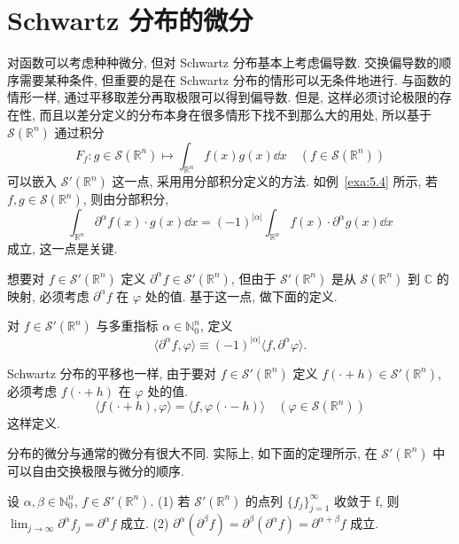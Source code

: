 
\section{Schwartz 分布的微分}\label{sec:5.5}




对函数可以考虑种种微分, 但对 Schwartz 分布基本上考虑偏导数. 交换偏导数的顺序需要某种条件, 但重要的是在 Schwartz 分布的情形可以无条件地进行. 与函数的情形一样, 通过平移取差分再取极限可以得到偏导数. 但是, 这样必须讨论极限的存在性, 而且以差分定义的分布本身在很多情形下找不到那么大的用处, 所以基于 $\mathcal{S}(\mathbb{R}^{n})$ 通过积分
\[
F_{f}: g \in \mathcal{S}(\mathbb{R}^{n}) \mapsto \int_{\mathbb{R}^{n}}f(x)g(x)\dd x \quad (f \in \mathcal{S}(\mathbb{R}^{n}))
\]
可以嵌入 $\mathcal{S}'(\mathbb{R}^{n})$ 这一点, 采用用分部积分定义的方法. 如例~\ref{exa:5.4} 所示, 若 $f, g \in \mathcal{S}(\mathbb{R}^{n})$, 则由分部积分,
\[
\int_{\mathbb{R}^{n}}\partial^{\alpha}f(x) \cdot g(x)\dd x = (-1)^{|\alpha|}\int_{\mathbb{R}^{n}}f(x) \cdot \partial^{\alpha}g(x)\dd x
\]
成立, 这一点是关键.

想要对 $f \in \mathcal{S}'(\mathbb{R}^{n})$ 定义 $\partial^{\alpha}f \in \mathcal{S}'(\mathbb{R}^{n})$, 但由于 $\mathcal{S}'(\mathbb{R}^{n})$ 是从 $\mathcal{S}(\mathbb{R}^{n})$ 到 $\mathbb{C}$ 的映射, 必须考虑 $\partial^{\alpha}f$ 在 $\varphi$ 处的值. 基于这一点, 做下面的定义.

\begin{definition}\label{def:5.6}
对 $f \in \mathcal{S}'(\mathbb{R}^{n})$ 与多重指标 $\alpha \in \mathbb{N}_{0}^{n}$, 定义
\[
\langle\partial^{\alpha}f, \varphi\rangle \equiv (-1)^{|\alpha|}\langle f, \partial^{\alpha}\varphi\rangle.
\]
\end{definition}

Schwartz 分布的平移也一样, 由于要对 $f \in \mathcal{S}'(\mathbb{R}^{n})$ 定义 $f(\cdot + h) \in \mathcal{S}'(\mathbb{R}^{n})$, 必须考虑 $f(\cdot + h)$ 在 $\varphi$ 处的值.
\[
\langle f(\cdot + h), \varphi\rangle = \langle f, \varphi(\cdot - h)\rangle \quad (\varphi \in \mathcal{S}(\mathbb{R}^{n}))
\]
这样定义.

分布的微分与通常的微分有很大不同. 实际上, 如下面的定理所示, 在 $\mathcal{S}'(\mathbb{R}^{n})$ 中可以自由交换极限与微分的顺序.

\begin{theorem}\label{thm:5.10}
设 $\alpha, \beta \in \mathbb{N}_{0}^{n}$, $f \in \mathcal{S}'(\mathbb{R}^{n})$.
(1) 若 $\mathcal{S}'(\mathbb{R}^{n})$ 的点列 $\{f_{j}\}_{j=1}^{\infty}$ 收敛于 f, 则 $\lim_{j \to \infty}\partial^{\alpha}f_{j} = \partial^{\alpha}f$ 成立.
(2) $\partial^{\alpha}(\partial^{\beta}f) = \partial^{\beta}(\partial^{\alpha}f) = \partial^{\alpha+\beta}f$ 成立.
\end{theorem}

